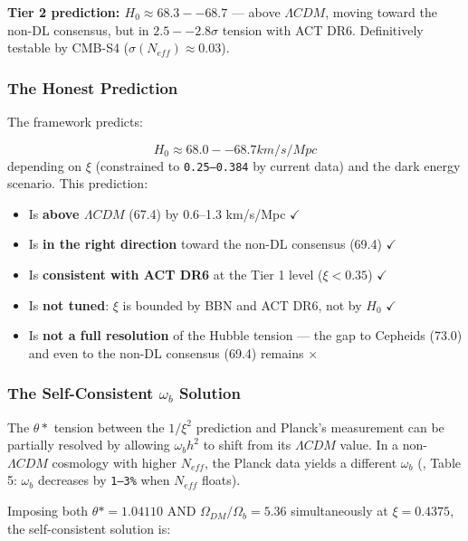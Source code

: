 \documentclass[aps,prd,preprint,superscriptaddress,longbibliography,floatfix]{revtex4-2}
\theoremstyle{remark}
\begin{document}
\textbf{Tier 2 prediction: $H_{0} \approx 68.3--68.7$} --- above $\Lambda CDM$, moving toward the non-DL consensus, but in $2.5--2.8\sigma$ tension with ACT DR6. Definitively testable by CMB-S4 ($\sigma(N_{eff}) \approx 0.03$).



\subsubsection{The Honest Prediction}

The framework predicts:


\begin{equation}
    H_{0} \approx 68.0--68.7 km/s/Mpc
\end{equation}
depending on $\xi$ (constrained to \texttt{0.25--0.384} by current data) and the dark energy scenario. This prediction:


\begin{itemize}
  \item Is \textbf{above $\Lambda CDM$} (67.4) by 0.6--1.3 km/s/Mpc $\checkmark$
  \item Is \textbf{in the right direction} toward the non-DL consensus (69.4) $\checkmark$
  \item Is \textbf{consistent with ACT DR6} at the Tier 1 level ($\xi < 0.35$) $\checkmark$
  \item Is \textbf{not tuned}: $\xi$ is bounded by BBN and ACT DR6, not by $H_{0}$ $\checkmark$
  \item Is \textbf{not a full resolution} of the Hubble tension --- the gap to Cepheids (73.0) and even to the non-DL consensus (69.4) remains $\times$
\end{itemize}


\subsubsection{The Self-Consistent $\omega_b$ Solution}

The $\theta*$ tension between the $1/\xi^{2}$ prediction and Planck's measurement can be partially resolved by allowing $\omega_b h^{2}$ to shift from its $\Lambda CDM$ value. In a non-$\Lambda CDM$ cosmology with higher $N_{eff}$, the Planck data yields a different $\omega_b$ (\cite{Planck2018_VI}, Table 5: $\omega_b$ decreases by \texttt{1--3\%} when $N_{eff}$ floats).

Imposing both $\theta* = 1.04110$ AND $\Omega_{DM}/\Omega_b = 5.36$ simultaneously at $\xi = 0.4375$, the self-consistent solution is:
\end{document}
